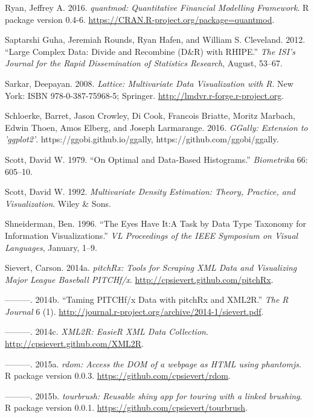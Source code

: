 \documentclass[12pt,]{isuthesis}
\begin{document}
\hypertarget{ref-quantmod}{}
Ryan, Jeffrey A. 2016. \emph{quantmod: Quantitative Financial Modelling
Framework}. R package version 0.4-6.
\url{https://CRAN.R-project.org/package=quantmod}.

\hypertarget{ref-RHIPE}{}
Saptarshi Guha, Jeremiah Rounds, Ryan Hafen, and William S. Cleveland.
2012. ``Large Complex Data: Divide and Recombine (D\&R) with RHIPE.''
\emph{The ISI's Journal for the Rapid Dissemination of Statistics
Research}, August, 53--67.

\hypertarget{ref-lattice}{}
Sarkar, Deepayan. 2008. \emph{Lattice: Multivariate Data Visualization
with R}. New York: ISBN 978-0-387-75968-5; Springer.
\url{http://lmdvr.r-forge.r-project.org}.

\hypertarget{ref-GGally}{}
Schloerke, Barret, Jason Crowley, Di Cook, Francois Briatte, Moritz
Marbach, Edwin Thoen, Amos Elberg, and Joseph Larmarange. 2016.
\emph{GGally: Extension to 'ggplot2'}. https://ggobi.github.io/ggally,
https://github.com/ggobi/ggally.

\hypertarget{ref-hist-scott}{}
Scott, David W. 1979. ``On Optimal and Data-Based Histograms.''
\emph{Biometrika} 66: 605--10.

\hypertarget{ref-mde}{}
Scott, David W. 1992. \emph{Multivariate Density Estimation: Theory,
Practice, and Visualization}. Wiley \& Sons.

\hypertarget{ref-details-on-demand}{}
Shneiderman, Ben. 1996. ``The Eyes Have It:A Task by Data Type Taxonomy
for Information Visualizations.'' \emph{VL Proceedings of the IEEE
Symposium on Visual Languages}, January, 1--9.

\hypertarget{ref-pitchRx}{}
Sievert, Carson. 2014a. \emph{pitchRx: Tools for Scraping XML Data and
Visualizing Major League Baseball PITCHf/x}.
\url{http://cpsievert.github.com/pitchRx}.

\hypertarget{ref-Sievert:2014a}{}
---------. 2014b. ``Taming PITCHf/x Data with pitchRx and XML2R.''
\emph{The R Journal} 6 (1).
\url{http://journal.r-project.org/archive/2014-1/sievert.pdf}.

\hypertarget{ref-XML2R}{}
---------. 2014c. \emph{XML2R: EasieR XML Data Collection}.
\url{http://cpsievert.github.com/XML2R}.

\hypertarget{ref-rdom}{}
---------. 2015a. \emph{rdom: Access the DOM of a webpage as HTML using
phantomjs}. R package version 0.0.3.
\url{https://github.com/cpsievert/rdom}.

\hypertarget{ref-tourbrush}{}
---------. 2015b. \emph{tourbrush: Reusable shiny app for touring with a
linked brushing}. R package version 0.0.1.
\url{https://github.com/cpsievert/tourbrush}.
\end{document}
